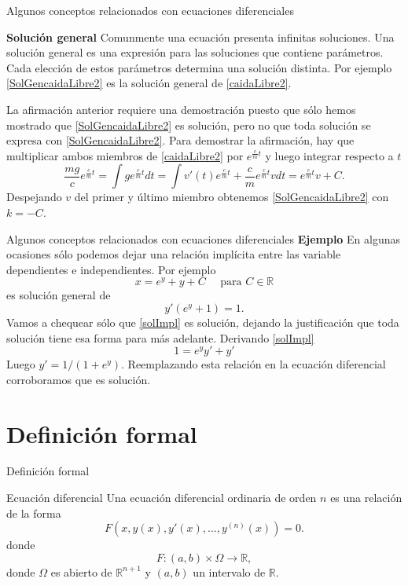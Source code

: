 \documentclass[handout,hyperref={colorlinks=true}]{beamer}
\newcommand{\rr}{\mathbb{R}}
\newcommand{\nl}{\onslide<+-> }
\begin{document}
\begin{frame}{Algunos conceptos relacionados con ecuaciones diferenciales}
 
\nl  \textbf{Solución general} Comunmente una ecuación presenta infinitas soluciones. Una solución general  es una expresión para las soluciones que 
contiene parámetros. Cada elección de estos parámetros determina una solución distinta. Por ejemplo \eqref{SolGencaidaLibre2} es la solución general de \eqref{caidaLibre2}.

\nl  La afirmación anterior requiere una demostración puesto que sólo hemos mostrado que \eqref{SolGencaidaLibre2} es solución, pero no
que toda solución se expresa con \eqref{SolGencaidaLibre2}. Para demostrar la afirmación, hay que multiplicar ambos miembros de \eqref{caidaLibre2} 
por $e^{\frac{c}{m}t}$ y luego integrar respecto a $t$ 
\[\frac{mg}{c}e^{\frac{c}{m}t}=\int ge^{\frac{c}{m}t}dt=\int v'(t)e^{\frac{c}{m}t}+\frac{c}{m}e^{\frac{c}{m}t} vdt=e^{\frac{c}{m}t}v+C.\]
 Despejando $v$ del primer y último miembro obtenemos \eqref{SolGencaidaLibre2} con $k=-C$.

 

\end{frame}

\begin{frame}{Algunos conceptos relacionados con ecuaciones diferenciales}
\textbf{Ejemplo} En algunas ocasiones sólo podemos dejar una relación implícita entre las variable dependientes e independientes. Por ejemplo
\begin{equation}\label{solImpl}x=e^y+y+C\quad\text{ para } C\in\rr\end{equation}
es solución general de
\[y'(e^y+1)=1.\]
Vamos a chequear sólo que \eqref{solImpl} es solución, dejando la justificación que toda solución tiene esa forma para más adelante. Derivando \eqref{solImpl}
\[ 1=e^yy'+y'\]
Luego $y'=1/(1+e^{y})$. Reemplazando esta relación  en la ecuación diferencial corroboramos que es solución.

\end{frame}

\section{Definición formal}
\begin{frame}{Definición formal}
\begin{block}{Ecuación diferencial} Una ecuación diferencial ordinaria de orden $n$ es una relación de la forma
\[\boxed{F(x,y(x),y'(x),\ldots,y^{(n)}(x))=0}.\]
donde
\[F:(a,b)\times \Omega\to\rr,
\]
donde $\Omega$ es abierto de $\rr^{n+1}$ y $(a,b)$ un intervalo de $\rr$.
 
\end{block}


\end{frame}
\end{document}
